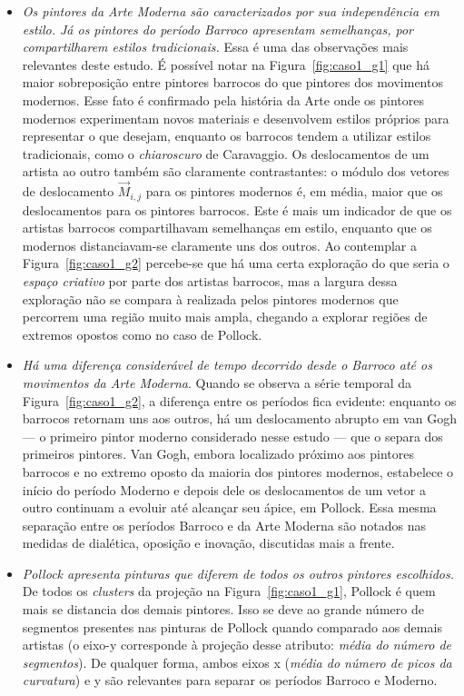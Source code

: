 \begin{itemize}
  \item \textit{Os pintores da Arte Moderna são caracterizados por sua
    independência em estilo. Já os pintores do período Barroco
    apresentam semelhanças, por compartilharem estilos tradicionais.}
    Essa é uma das observações mais relevantes deste estudo. É
    possível notar na Figura~\ref{fig:caso1_g1} que há maior
    sobreposição entre pintores barrocos do que pintores dos
    movimentos modernos. Esse fato é confirmado pela história da Arte
    onde os pintores modernos experimentam novos materiais e
    desenvolvem estilos próprios para representar o que desejam,
    enquanto os barrocos tendem a utilizar estilos tradicionais, como
    o \textit{chiaroscuro} de Caravaggio. Os deslocamentos de um
    artista ao outro também são claramente contrastantes: o módulo dos
    vetores de deslocamento $\vec{M}_{i,j}$ para os pintores modernos
    é, em média, maior que os deslocamentos para os pintores
    barrocos. Este é mais um indicador de que os artistas barrocos
    compartilhavam semelhanças em estilo, enquanto que os modernos
    distanciavam-se claramente uns dos outros. Ao contemplar a
    Figura~\ref{fig:caso1_g2} percebe-se que há uma certa exploração
    do que seria o \textit{espaço criativo} por parte dos artistas
    barrocos, mas a largura dessa exploração não se compara à
    realizada pelos pintores modernos que percorrem uma região muito
    mais ampla, chegando a explorar regiões de extremos opostos como
    no caso de Pollock.

\item \textit{Há uma diferença considerável de tempo decorrido desde o
  Barroco até os movimentos da Arte Moderna}. Quando se observa a
  série temporal da Figura~\ref{fig:caso1_g2}, a diferença entre os
  períodos fica evidente: enquanto os barrocos retornam uns aos
  outros, há um deslocamento abrupto em van Gogh --- o primeiro pintor
  moderno considerado nesse estudo --- que o separa dos primeiros
  pintores. Van Gogh, embora localizado próximo aos pintores barrocos
  e no extremo oposto da maioria dos pintores modernos, estabelece o
  início do período Moderno e depois dele os deslocamentos de um vetor
  a outro continuam a evoluir até alcançar seu ápice, em Pollock. Essa
  mesma separação entre os períodos Barroco e da Arte Moderna são
  notados nas medidas de dialética, oposição e inovação, discutidas
  mais a frente.

  \item \textit{Pollock apresenta pinturas que diferem de todos os
    outros pintores escolhidos.} De todos os \textit{clusters} da
    projeção na Figura~\ref{fig:caso1_g1}, Pollock é quem mais se
    distancia dos demais pintores. Isso se deve ao grande número de
    segmentos presentes nas pinturas de Pollock quando comparado aos
    demais artistas (o eixo-y corresponde à projeção desse atributo:
    \emph{média do número de segmentos}). De qualquer forma, ambos
    eixos x (\emph{média do número de picos da curvatura}) e y são
    relevantes para separar os períodos Barroco e Moderno.


\end{itemize}
